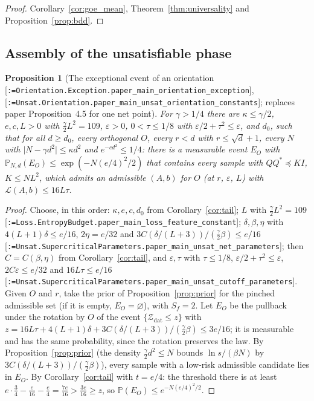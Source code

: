 \documentclass[11pt]{article}
\makeatletter
\newcommand{\formal@break}[1]{\@tfor\formal@tok:=#1\do{%
  \formal@tok
  \expandafter\ifx\formal@tok.\allowbreak\else
  \expandafter\ifx\formal@tok\_\allowbreak\fi\fi}}
\DeclareRobustCommand{\formal}[1]{\textnormal{[\texttt{\small\formal@break{#1}}]}}
\newcommand{\Prob}{\mathbb{P}}
\newcommand{\abs}[1]{\lvert #1\rvert}
\newcommand{\sqd}{\sqrt{d}}
\newcommand{\Id}{I}
\theoremstyle{plain}
\newtheorem{proposition}[theorem]{Proposition}
\theoremstyle{definition}
\makeatother
\begin{document}
\begin{proof}
Corollary~\ref{cor:goe_mean}, Theorem~\ref{thm:universality} and
Proposition~\ref{prop:bdd}.
\end{proof}

\subsection{Assembly of the unsatisfiable phase}\label{sec:unsat_assembly}

\begin{proposition}[The exceptional event of an orientation \formal{Orientation.Exception.paper\_main\_orientation\_exception}, \formal{Unsat.Orientation.paper\_main\_unsat\_orientation\_constants}; replaces paper Proposition~4.5 for one net point]\label{prop:exception}
For $\gamma > 1/4$ there are $\kappa \le \gamma/2$, $e, c, L > 0$ with
$\frac\gamma2L^2 = 109$, $\varepsilon > 0$, $0 < \tau \le 1/8$ with
$\varepsilon/2 + \tau^2 \le \varepsilon$, and $d_0$, such that for all $d \ge d_0$,
every orthogonal $O$, every $r < d$ with $r \le \sqd + 1$, every $N$ with
$\abs{N - \gamma d^2} \le \kappa d^2$ and $e^{-cd^2} \le 1/4$: there is a
measurable event $E_O$ with $\Prob_{N,d}(E_O) \le \exp(-N(e/4)^2/2)$ that
contains every sample with $QQ^{*} \preceq K\Id$, $K \le NL^2$, which admits an
admissible $(A, b)$ for $O$ (at $r$, $\varepsilon$, $L$) with
$\mathcal{L}(A, b) \le 16L\tau$.
\end{proposition}

\begin{proof}
Choose, in this order: $\kappa, e, c, d_0$ from Corollary~\ref{cor:tail};
$L$ with $\frac\gamma2L^2 = 109$ \formal{Loss.EntropyBudget.paper\_main\_loss\_feature\_constant};
$\delta, \beta, \eta$ with $4(L+1)\delta \le e/16$, $2\eta = e/32$ and
$3C(\delta/(L+3))/(\frac\gamma2\beta) \le e/16$ \formal{Unsat.SupercriticalParameters.paper\_main\_unsat\_net\_parameters};
then $C = C(\beta,\eta)$ from Corollary~\ref{cor:tail}, and $\varepsilon, \tau$
with $\tau \le 1/8$, $\varepsilon/2 + \tau^2 \le \varepsilon$, $2C\varepsilon \le e/32$
and $16L\tau \le e/16$ \formal{Unsat.SupercriticalParameters.paper\_main\_unsat\_cutoff\_parameters}.
Given $O$ and $r$, take the prior of Proposition~\ref{prop:prior} for the
pinched admissible set (if it is empty, $E_O = \varnothing$), with
$S_f = 2$. Let $E_O$ be the pullback under the rotation by $O$ of the
event $\{\mathcal{Z}_{\mathrm{dat}} \le z\}$ with
$z = 16L\tau + 4(L+1)\delta + 3C(\delta/(L+3))/(\frac\gamma2\beta) \le 3e/16$;
it is measurable and has the same probability, since the rotation
preserves the law. By Proposition~\ref{prop:prior} (the density
$\frac\gamma2d^2 \le N$ bounds $\ln s/(\beta N)$ by $3C(\delta/(L+3))/(\frac\gamma2\beta)$),
every sample with a low-risk admissible candidate lies in $E_O$. By
Corollary~\ref{cor:tail} with $t = e/4$: the threshold there is at least
$e\cdot\frac34 - \frac e{16} - \frac e4 = \frac{7e}{16} > \frac{3e}{16} \ge z$,
so $\Prob(E_O) \le e^{-N(e/4)^2/2}$.
\end{proof}
\end{document}

